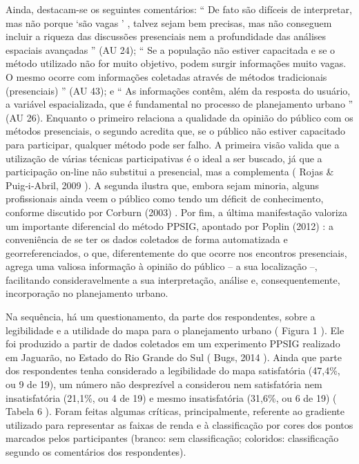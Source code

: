 \documentclass{article}
\begin{document}
Ainda, destacam-se os seguintes comentários: “%
De fato são difíceis de
						interpretar, mas não porque ‘são vagas%
’%
, talvez sejam bem
						precisas, mas não conseguem incluir a riqueza das discussões presenciais nem
						a profundidade das análises espaciais avançadas%
” (AU 24);
						“%
Se a população não estiver capacitada e se o método utilizado não
						for muito objetivo, podem surgir informações muito vagas. O mesmo ocorre com
						informações coletadas através de métodos tradicionais
					(presenciais)%
” (AU 43); e “%
As informações contêm, além da
						resposta do usuário, a variável espacializada, que é fundamental no processo
						de planejamento urbano%
” (AU 26). Enquanto o primeiro relaciona a
					qualidade da opinião do público com os métodos presenciais, o segundo acredita
					que, se o público não estiver capacitado para participar, qualquer método pode
					ser falho. A primeira visão valida que a utilização de várias técnicas
					participativas é o ideal a ser buscado, já que a participação on-line não
					substitui a presencial, mas a complementa (%
Rojas \& Puig‐i‐Abril, 2009%
). A segunda ilustra que, embora sejam
					minoria, alguns profissionais ainda veem o público como tendo um déficit de
					conhecimento, conforme discutido por %
Corburn
						(2003)%
. Por fim, a última manifestação valoriza um importante
					diferencial do método PPSIG, apontado por %
Poplin (2012)%
: a conveniência de se ter os dados coletados de forma
					automatizada e georreferenciados, o que, diferentemente do que ocorre nos
					encontros presenciais, agrega uma valiosa informação à opinião do público – a
					sua localização –, facilitando consideravelmente a sua interpretação, análise e,
					consequentemente, incorporação no planejamento urbano.

Na sequência, há um questionamento, da parte dos respondentes, sobre a
					legibilidade e a utilidade do mapa para o planejamento urbano (%
Figura 1%
). Ele foi produzido a partir de
					dados coletados em um experimento PPSIG realizado em Jaguarão, no Estado do Rio
					Grande do Sul (%
Bugs, 2014%
). Ainda que
					parte dos respondentes tenha considerado a legibilidade do mapa satisfatória
					(47,4\%, ou 9 de 19), um número não desprezível a considerou nem satisfatória nem
					insatisfatória (21,1\%, ou 4 de 19) e mesmo insatisfatória (31,6\%, ou 6 de 19)
						(%
Tabela 6%
). Foram feitas algumas
					críticas, principalmente, referente ao gradiente utilizado para representar as
					faixas de renda e à classificação por cores dos pontos marcados pelos
					participantes (branco: sem classificação; coloridos: classificação segundo os
					comentários dos respondentes).
\end{document}
